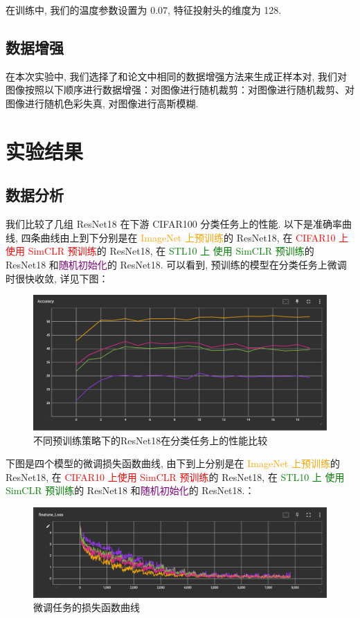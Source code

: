 \documentclass[notitlepage,cs4size,punct,oneside]{ctexrep}
\numberwithin{equation}{chapter}
\theoremstyle{mystyle}
\begin{document}
在训练中, 我们的温度参数设置为 0.07, 特征投射头的维度为 128.

\subsection{数据增强}
在本次实验中, 我们选择了和论文中相同的数据增强方法来生成正样本对, 我们对图像按照以下顺序进行数据增强：对图像进行随机裁剪：对图像进行随机裁剪、对图像进行随机色彩失真, 对图像进行高斯模糊.


\section{实验结果}
\subsection{数据分析}

我们比较了几组 ResNet18 在下游 CIFAR100 分类任务上的性能. 以下是准确率曲线, 四条曲线由上到下分别是在 \textcolor{orange}{ImageNet 上预训练}的 ResNet18, 在 \textcolor{red}{CIFAR10 上使用 SimCLR 预训练}的 ResNet18, 在 \textcolor{green}{STL10 上 使用 SimCLR 预训练}的 ResNet18 和\textcolor{purple}{随机初始化}的 ResNet18. 可以看到, 预训练的模型在分类任务上微调时很快收敛, 详见下图：
\begin{figure}[H]
    \centering
    \includegraphics[width=1\linewidth]{finetune_accuracy.png}
    \caption{不同预训练策略下的ResNet18在分类任务上的性能比较}
    \label{finetune_accuracy}
\end{figure}

下图是四个模型的微调损失函数曲线, 由下到上分别是在 \textcolor{orange}{ImageNet 上预训练}的 ResNet18, 在 \textcolor{red}{CIFAR10 上使用 SimCLR 预训练}的 ResNet18, 在 \textcolor{green}{STL10 上 使用 SimCLR 预训练}的 ResNet18 和\textcolor{purple}{随机初始化}的 ResNet18.：

\begin{figure}[H]
    \centering
    \includegraphics[width=1\linewidth]{fine-tune_loss.png}
    \caption{微调任务的损失函数曲线}
    \label{fig:enter-label}
\end{figure}
\end{document}
